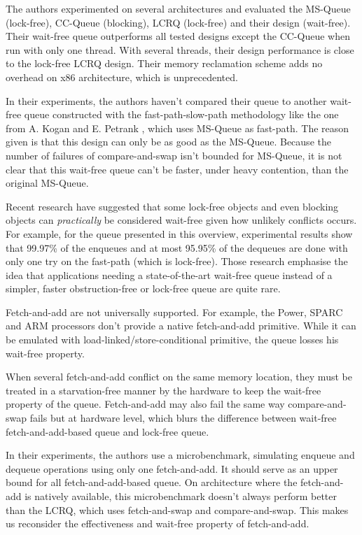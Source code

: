 


The authors experimented on several architectures and evaluated the MS-Queue
(lock-free), CC-Queue (blocking), LCRQ (lock-free) and their design (wait-free).
Their wait-free queue outperforms all tested designs except the CC-Queue when
run with only one thread. With several threads, their design performance is
close to the lock-free LCRQ design. Their memory reclamation scheme adds no
overhead on x86 architecture, which is unprecedented.

In their experiments, the authors haven't compared their queue to another
wait-free queue constructed with the fast-path-slow-path methodology like the
one from A. Kogan and E. Petrank \cite{Kogan:2012:MCF:2370036.2145835}, which
uses MS-Queue as fast-path. The reason given is that this design can only be as
good as the MS-Queue. Because the number of failures of compare-and-swap isn't
bounded for MS-Queue, it is not clear that this wait-free queue can't be faster,
under heavy contention, than the original MS-Queue.

Recent research have suggested that some lock-free objects
\cite{Alistarh:2016:LCA:2997039.2903136} and even blocking objects
\cite{David:2016:CSD:2935764.2935774} can \textit{practically} be considered
wait-free given how unlikely conflicts occurs. For example, for the queue
presented in this overview, experimental results show that 99.97\% of the
enqueues and at most 95.95\% of the dequeues are done with only one try on the
fast-path (which is lock-free). Those research emphasise the idea that
applications needing a state-of-the-art wait-free queue instead of a simpler,
faster obstruction-free or lock-free queue are quite rare.

Fetch-and-add are not universally supported. For example, the Power, SPARC and
ARM processors don't provide a native fetch-and-add primitive. While it can be
emulated with load-linked/store-conditional primitive, the queue losses his
wait-free property.

When several fetch-and-add conflict on the same memory location, they must be
treated in a starvation-free manner by the hardware to keep the wait-free
property of the queue. Fetch-and-add may also fail the same way compare-and-swap
fails but at hardware level, which blurs the difference between wait-free
fetch-and-add-based queue and lock-free queue.

In their experiments, the authors use a microbenchmark, simulating enqueue and
dequeue operations using only one fetch-and-add. It should serve as an upper
bound for all fetch-and-add-based queue. On architecture where the fetch-and-add
is natively available, this microbenchmark doesn't always perform better than
the LCRQ, which uses fetch-and-swap and compare-and-swap. This makes us
reconsider the effectiveness and wait-free property of fetch-and-add.
